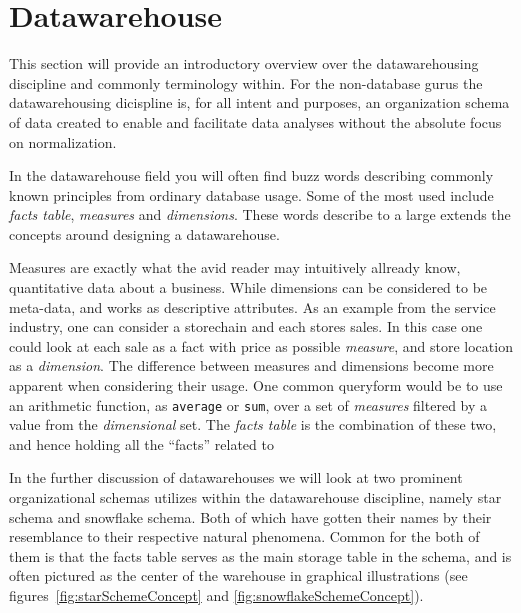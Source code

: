\section{Datawarehouse}
	\noindent
	This section will provide an introductory overview over the datawarehousing discipline and commonly terminology within. 
	For the non-database gurus the datawarehousing dicispline is, for all intent and purposes, an organization schema of
	data created to enable and facilitate data analyses without the absolute focus on normalization. \cite{oracle:dataware}
	
	\bigskip\noindent
	In the datawarehouse field you will often find buzz words describing commonly known principles from ordinary database
	usage. Some of the most used include \textit{facts table}, \textit{measures} and \textit{dimensions}.
	These words describe to a large extends the concepts around designing a datawarehouse. 
	
	\bigskip\noindent
	Measures are exactly what the avid reader may intuitively allready know, quantitative data about a business.
	While dimensions can be considered to be meta-data, and works as descriptive attributes. 
	As an example from the service industry, one can consider a storechain and each stores sales. 
	In this case one could look at each sale as a fact with price as possible \textit{measure},
	and store location as a \textit{dimension}. 
	The difference between measures and dimensions become more apparent when considering their usage.
	One common queryform would be to use an arithmetic function, as \texttt{average} or \texttt{sum}, over a set of
	\textit{measures} filtered by a value from the \textit{dimensional} set.
	The \textit{facts table} is the combination of these two, and hence holding all the "`facts"' related to 
	
	
	\bigskip\noindent
	In the further discussion of datawarehouses we will look at two prominent organizational schemas utilizes 
	within the datawarehouse discipline, namely star schema and snowflake schema. 
	Both of which have gotten their names by their resemblance to their respective natural phenomena.
	Common for the both of them is that the facts table serves as the main storage table in the schema, 
	and is often pictured as the center of the warehouse in graphical illustrations (see figures~\ref{fig:starSchemeConcept} and \ref{fig:snowflakeSchemeConcept}). 
	
